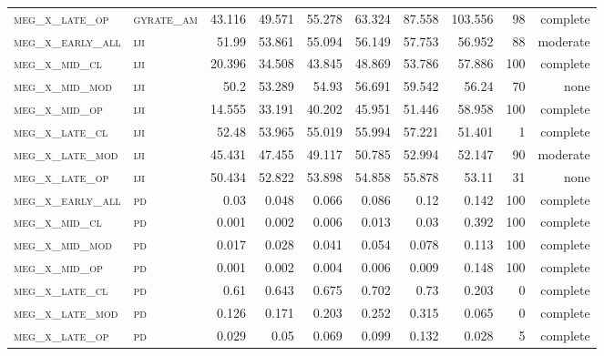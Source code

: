 \begin{landscape}
\begin{center}
\begin{footnotesize}
\begin{longtable}{llrrrrr|rrr}
\textsc{meg\_x\_late\_op  } & \textsc{gyrate\_am}    & 43.116   & 49.571   & 55.278   & 63.324   & 87.558   & 103.556  & 98  & complete \\
\textsc{meg\_x\_early\_all} & \textsc{iji       }    & 51.99    & 53.861   & 55.094   & 56.149   & 57.753   & 56.952   & 88  & moderate \\
\textsc{meg\_x\_mid\_cl   } & \textsc{iji       }    & 20.396   & 34.508   & 43.845   & 48.869   & 53.786   & 57.886   & 100 & complete \\
\textsc{meg\_x\_mid\_mod  } & \textsc{iji       }    & 50.2     & 53.289   & 54.93    & 56.691   & 59.542   & 56.24    & 70  & none     \\
\textsc{meg\_x\_mid\_op   } & \textsc{iji       }    & 14.555   & 33.191   & 40.202   & 45.951   & 51.446   & 58.958   & 100 & complete \\
\textsc{meg\_x\_late\_cl  } & \textsc{iji       }    & 52.48    & 53.965   & 55.019   & 55.994   & 57.221   & 51.401   & 1   & complete \\
\textsc{meg\_x\_late\_mod } & \textsc{iji       }    & 45.431   & 47.455   & 49.117   & 50.785   & 52.994   & 52.147   & 90  & moderate \\
\textsc{meg\_x\_late\_op  } & \textsc{iji       }    & 50.434   & 52.822   & 53.898   & 54.858   & 55.878   & 53.11    & 31  & none     \\
\textsc{meg\_x\_early\_all} & \textsc{pd        }    & 0.03     & 0.048    & 0.066    & 0.086    & 0.12     & 0.142    & 100 & complete \\
\textsc{meg\_x\_mid\_cl   } & \textsc{pd        }    & 0.001    & 0.002    & 0.006    & 0.013    & 0.03     & 0.392    & 100 & complete \\
\textsc{meg\_x\_mid\_mod  } & \textsc{pd        }    & 0.017    & 0.028    & 0.041    & 0.054    & 0.078    & 0.113    & 100 & complete \\
\textsc{meg\_x\_mid\_op   } & \textsc{pd        }    & 0.001    & 0.002    & 0.004    & 0.006    & 0.009    & 0.148    & 100 & complete \\
\textsc{meg\_x\_late\_cl  } & \textsc{pd        }    & 0.61     & 0.643    & 0.675    & 0.702    & 0.73     & 0.203    & 0   & complete \\
\textsc{meg\_x\_late\_mod } & \textsc{pd        }    & 0.126    & 0.171    & 0.203    & 0.252    & 0.315    & 0.065    & 0   & complete \\
\textsc{meg\_x\_late\_op  } & \textsc{pd        }    & 0.029    & 0.05     & 0.069    & 0.099    & 0.132    & 0.028    & 5   & complete \\

\end{longtable}
\end{footnotesize}
\end{center}
\end{landscape}
